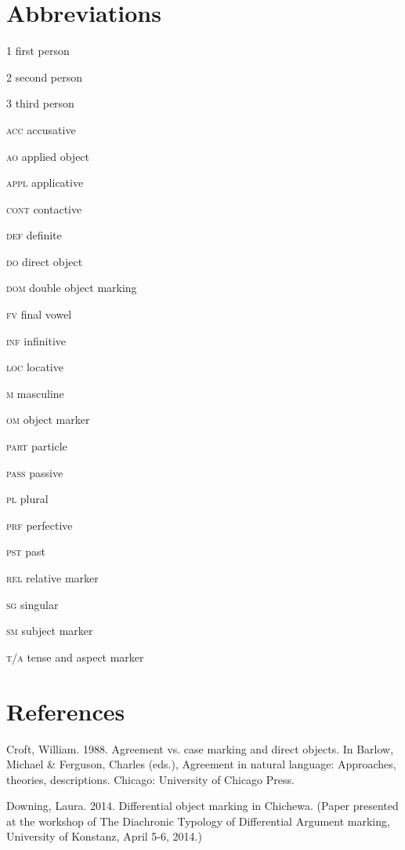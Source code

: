 \documentclass[output=paper]{langsci/langscibook}
\begin{document}
\section {Abbreviations}

{\textsc{1  }}{first person}

{\textsc{2  }}{second person}

{\textsc{3  }}{third person}

{\textsc{acc  }}{accusative}

{\textsc{ao  }}applied object

{\textsc{appl  }}{applicative}

{\textsc{cont}}  {contactive}

{\textsc{def  }}{definite}

{\textsc{do  }}direct object

\textsc{dom}  double object marking

{\textsc{fv  }}final vowel

{\textsc{inf  }}infinitive

{\textsc{loc}}  locative

{\textsc{m  }}masculine

{\textsc{om  }}object marker

{\textsc{part  }}particle

{\textsc{pass  }}passive

{\textsc{pl  }}plural

{\textsc{prf  }}perfective

{\textsc{pst  }}past

{\textsc{rel}}  relative marker

{\textsc{sg  }}singular

{\textsc{sm  }}subject marker

{\textsc{t}}/{\textsc{a  }}tense and aspect marker

\section {References}


Croft, William. 1988. Agreement vs. case marking and direct objects. In Barlow, Michael & Ferguson, Charles (eds.), Agreement in natural language: Approaches, theories, descriptions. Chicago: University of Chicago Press.

Downing, Laura. 2014. Differential object marking in Chichewa. (Paper presented at the workshop of The Diachronic Typology of Differential Argument marking, University of Konstanz, April 5-6, 2014.)
\end{document}
